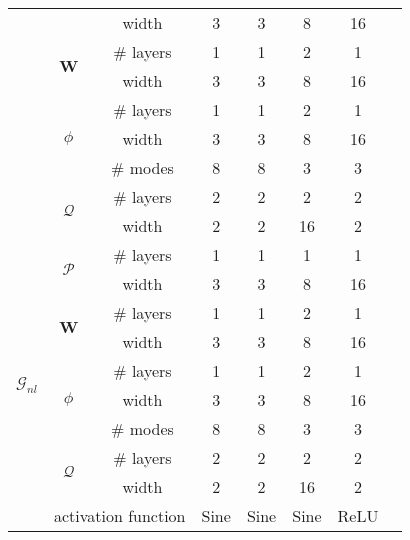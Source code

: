 \begin{table}[!htbp]
\begin{tabular}{cccccccc}
   &                          & width        &   3     &     3    &    8     &      16     \\ \cline{2-7}
   & \multirow{2}{*}{$\mathbf{W}$}      & \# layers    &    1    &     1    &   2      &    1       \\
   &                          & width        &   3     &    3     &     8    &      16     \\ \cline{2-7}
   & \multirow{3}{*}{$\phi$}     & \# layers    &   1     &   1      &   2      &     1      \\
   &                          & width        &     3   &    3     &    8     &      16     \\
   &                          & \# modes      &     8   &    8     &    3     &     3      \\ \cline{2-7}
   & \multirow{2}{*}{$\mathcal Q$}      & \# layers    &   2     &     2    &     2    &     2      \\
   &                          & width        &   2     &    2     &    16     &     2      \\ \midrule
\multirow{10}{*}{$\mathcal G_{nl}$}
   & \multirow{2}{*}{$\mathcal P$}      & \# layers    &   1     &     1    &     1    &  1         \\
   &                          & width        &   3     &    3     &    8     &      16     \\ \cline{2-7}
   & \multirow{2}{*}{$\mathbf{W}$}      & \# layers    &   1     &     1    &    2     &   1        \\
   &                          & width        &    3    &    3     &    8     &       16    \\ \cline{2-7}
   & \multirow{3}{*}{$\phi$}     & \# layers    &    1    &    1     &   2      &      1     \\
   &                          & width        &    3    &     3    &     8    &     16      \\
   &                          & \# modes      &    8    &    8     &     3    &    3       \\ \cline{2-7}
   & \multirow{2}{*}{$\mathcal Q$}      & \# layers    &  2      &     2    &    2     &      2     \\
   &                          & width        &   2     &   2      &    16     &      2     \\ \cline{2-7}
   & \multicolumn{2}{l}{activation function} &   Sine     &   Sine      &   Sine      &     ReLU     \\ \bottomrule
\end{tabular}
\end{table}

